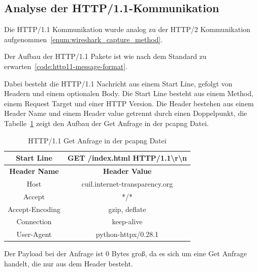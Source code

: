 \subsection{Analyse der HTTP/1.1-Kommunikation}

Die HTTP/1.1 Kommunikation wurde analog zu der HTTP/2 Kommunikation aufgenommen~\ref{enum:wireshark_capture_method}.

Der Aufbau der HTTP/1.1 Pakete ist wie nach dem Standard zu erwarten~\ref{code:http11-message-format}.


Dabei besteht die HTTP/1.1 Nachricht aus einem Start Line, gefolgt von Headern und einem optionalen Body.
Die Start Line besteht aus einem Method, einem Request Target und einer HTTP Version.
Die Header bestehen aus einem Header Name und einem Header value getrennt durch einen Doppelpunkt, die Tabelle~\ref{tab:http11-header-request} zeigt den Aufbau der Get Anfrage in der pcapng Datei.

\begin{table}[h]
    \centering
    \begin{tabular}{|c|c|}
        \hline
        \textbf{Start Line} & GET /index.html HTTP/1.1\textbackslash r\textbackslash n \\
        \hline
        \textbf{Header Name} & \textbf{Header Value} \\
        \hline
        Host & cuil.internet-transparency.org \\
        Accept & */* \\
        Accept-Encoding & gzip, deflate \\
        Connection & keep-alive \\
        User-Agent & python-httpx/0.28.1 \\
        \hline
    \end{tabular}
    \caption{HTTP/1.1 Get Anfrage in der pcapng Datei}\label{tab:http11-header-request}
\end{table}

Der Payload bei der Anfrage ist 0 Bytes groß, da es sich um eine Get Anfrage handelt, die nur aus dem Header besteht.

